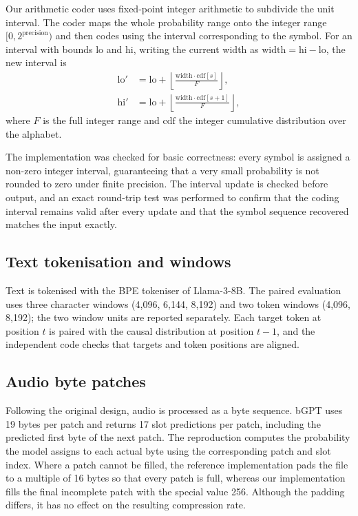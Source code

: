 \documentclass[12pt,a4paper]{article}
\begin{document}
Our arithmetic coder uses fixed-point integer arithmetic to subdivide the unit interval. The
coder maps the whole probability range onto the integer range $[0, 2^{\text{precision}})$ and
then codes using the interval corresponding to the symbol. For an interval with bounds
$\mathrm{lo}$ and $\mathrm{hi}$, writing the current width as $\mathrm{width} = \mathrm{hi} -
\mathrm{lo}$, the new interval is
\begin{align}
  \mathrm{lo}' &= \mathrm{lo} + \left\lfloor \frac{\mathrm{width}\cdot \mathrm{cdf}[s]}{F} \right\rfloor, \\
  \mathrm{hi}' &= \mathrm{lo} + \left\lfloor \frac{\mathrm{width}\cdot \mathrm{cdf}[s+1]}{F} \right\rfloor,
\end{align}
where $F$ is the full integer range and $\mathrm{cdf}$ the integer cumulative distribution
over the alphabet.

The implementation was checked for basic correctness: every symbol is assigned a non-zero
integer interval, guaranteeing that a very small probability is not rounded to zero under
finite precision. The interval update is checked before output, and an exact round-trip test
was performed to confirm that the coding interval remains valid after every update and that
the symbol sequence recovered matches the input exactly.

\subsection{Text tokenisation and windows}

Text is tokenised with the BPE tokeniser of Llama-3-8B. The paired evaluation uses three
character windows (4{,}096, 6{,}144, 8{,}192) and two token windows (4{,}096, 8{,}192); the
two window units are reported separately. Each target token at position $t$ is paired with
the causal distribution at position $t-1$, and the independent code checks that targets and
token positions are aligned.

\subsection{Audio byte patches}

Following the original design, audio is processed as a byte sequence. bGPT uses 19 bytes per
patch and returns 17 slot predictions per patch, including the predicted first byte of the
next patch. The reproduction computes the probability the model assigns to each actual byte
using the corresponding patch and slot index. Where a patch cannot be filled, the reference
implementation pads the file to a multiple of 16 bytes so that every patch is full, whereas
our implementation fills the final incomplete patch with the special value 256. Although the
padding differs, it has no effect on the resulting compression rate.
\end{document}
